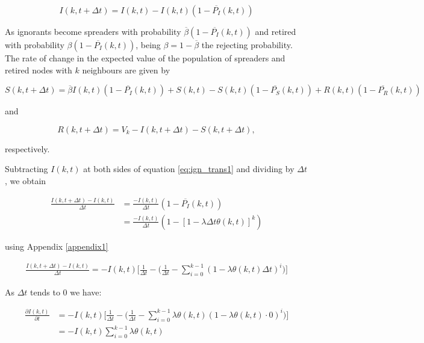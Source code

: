 \begin{equation}
\label{eq:ign_trans1}
I(k,t+\Delta t)=I(k,t)-I(k,t)(1-\overline{P_{I}}(k,t))
\end{equation}

As ignorants become spreaders with probability $\overline{\beta}(1-\overline{P_{I}}(k,t))$ and retired with probability $\beta(1-\overline{P_{I}}(k,t))$, being $\beta=1-\overline{\beta}$ the rejecting probability. The rate of change in the expected value of the population of spreaders and retired nodes with $k$ neighbours are given by

\begin{equation}
S(k,t+\Delta t)=\overline{\beta}I(k,t)(1-\overline{P_{I}}(k,t))+S(k,t)-S(k,t)(1-\overline{P_{S}}(k,t))+R(k,t)(1-\overline{P_{R}}(k,t))
\end{equation}

and 

\begin{equation}
R(k,t+\Delta t)=V_k-I(k,t+\Delta t)-S(k,t+\Delta t),
\end{equation}

respectively. 

Subtracting $I(k,t)$ at both sides of equation \ref{eq:ign_trans1} and dividing by $\Delta t$, we obtain

$$
\begin{aligned}
\frac{I(k,t+\Delta t)-I(k,t)}{\Delta t}&=\frac{-I(k,t)}{\Delta t}(1-\overline{P_{I}}(k,t))\\
&=\frac{-I(k,t)}{\Delta t}(1-[1-\lambda\Delta t\theta(k,t)]^k)
\end{aligned}
$$

using Appendix \ref{appendix1}

$$
\begin{aligned}
\frac{I(k,t+\Delta t)-I(k,t)}{\Delta t}=-I(k,t)\Bigg[\frac{1}{\Delta t}-\Bigg(\frac{1}{\Delta t}-\sum_{i=0}^{k-1}(1-\lambda\theta(k,t)\Delta t)^i\Bigg)\Bigg]
\end{aligned}
$$

As $\Delta t$ tends to $0$ we have:

$$
\begin{aligned}
\frac{\partial I(k,t)}{\partial t}&=-I(k,t)\Bigg[\frac{1}{\Delta t}-\Bigg(\frac{1}{\Delta t}-\sum_{i=0}^{k-1}\lambda\theta(k,t)(1-\lambda\theta(k,t)\cdot0)^i\Bigg)\Bigg]\\
&=-I(k,t)\sum_{i=0}^{k-1}\lambda\theta(k,t)\\
\end{aligned}
$$

